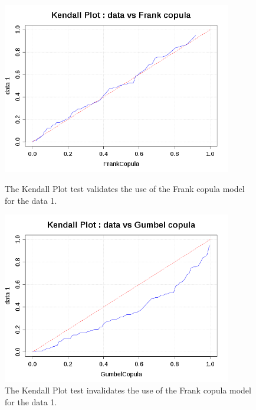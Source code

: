 \begin{figure}[H]
  \begin{minipage}{10cm}
    \begin{center}
      \includegraphics[width=10cm]{KendallPlotCopula.png}
    \end{center}
    \caption{The Kendall Plot test validates the use of the Frank copula model for the data 1.}
    \label{GoodCop}
  \end{minipage}
  \hfill
  \begin{minipage}{10cm}
    \begin{center}
      \includegraphics[width=10cm]{KendallPlotCopulaBad.png}
    \end{center}
    \caption{The Kendall Plot test invalidates the use of the Frank copula model for the data 1.}
    \label{BadCop}
  \end{minipage}
\end{figure}


